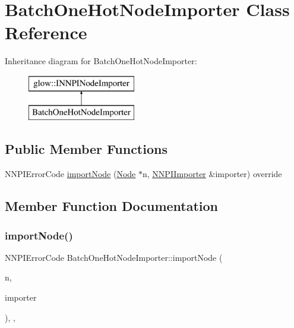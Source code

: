 \hypertarget{class_batch_one_hot_node_importer}{}\section{Batch\+One\+Hot\+Node\+Importer Class Reference}
\label{class_batch_one_hot_node_importer}
Inheritance diagram for Batch\+One\+Hot\+Node\+Importer\+:\begin{figure}[H]
\begin{center}
\leavevmode
\includegraphics[height=2.000000cm]{class_batch_one_hot_node_importer}
\end{center}
\end{figure}
\subsection*{Public Member Functions}
\begin{DoxyCompactItemize}
\item 
N\+N\+P\+I\+Error\+Code \hyperlink{class_batch_one_hot_node_importer_a00b113ed88735a6bf474ff63a7145ddc}{import\+Node} (\hyperlink{classglow_1_1_node}{Node} $\ast$n, \hyperlink{classglow_1_1_n_n_p_i_importer}{N\+N\+P\+I\+Importer} \&importer) override
\end{DoxyCompactItemize}


\subsection{Member Function Documentation}
\mbox{\label{class_batch_one_hot_node_importer_a00b113ed88735a6bf474ff63a7145ddc}} 
\subsubsection{\texorpdfstring{import\+Node()}{importNode()}}
{\footnotesize\ttfamily N\+N\+P\+I\+Error\+Code Batch\+One\+Hot\+Node\+Importer\+::import\+Node (\begin{DoxyParamCaption}\item[{\hyperlink{classglow_1_1_node}{Node} $\ast$}]{n,  }\item[{\hyperlink{classglow_1_1_n_n_p_i_importer}{N\+N\+P\+I\+Importer} \&}]{importer }\end{DoxyParamCaption})\hspace{0.3cm}{\ttfamily [inline]}, {\ttfamily [override]}, {\ttfamily [virtual]}}

